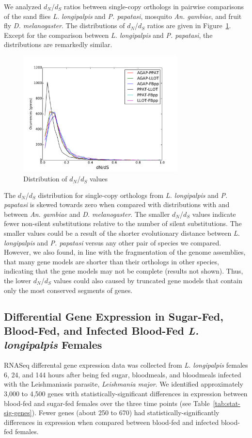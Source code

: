We analyzed $d_N$/$d_S$ ratios between single-copy orthologs in pairwise comparisons of the sand flies \emph{L. longipalpis} and \emph{P. papatasi}, mosquito \emph{An. gambiae}, and fruit fly \emph{D. melanogaster}.  The distributions of $d_N$/$d_S$ ratios are given in Figure~\ref{fig:dnds-distr}.  Except for the comparison between \emph{L. longipalpis} and \emph{P. papatasi}, the distributions are remarkedly similar.

\begin{figure}[H]
  \centering
  \includegraphics[width=0.75\textwidth]{figures/ka_ks/dN_dS}
  \caption{Distribution of $d_N$/$d_S$ values}
  \label{fig:dnds-distr}
\end{figure}


The $d_N$/$d_S$ distribution for single-copy orthologs from \emph{L. longipalpis} and \emph{P. papatasi} is skewed towards zero when compared with distributions with and between \emph{An. gambiae} and \emph{D. melanogaster}.  The smaller $d_N$/$d_S$ values indicate fewer non-silent substitutions relative to the number of silent substitutions.  The smaller values could be a result of the shorter evolutionary distance between \emph{L. longipalpis} and \emph{P. papatasi} versus any other pair of species we compared.  However, we also found, in line with the fragmentation of the genome assemblies, that many gene models are shorter than their orthologs in other species, indicating that the gene models may not be complete (results not shown).  Thus, the lower $d_N$/$d_S$ values could also caused by truncated gene models that contain only the most conserved segments of genes.

\subsection{Differential Gene Expression in Sugar-Fed, Blood-Fed, and Infected Blood-Fed \emph{L. longipalpis} Females}
RNASeq differental gene expression data was collected from \emph{L. longipalpis} females 6, 24, and 144 hours after being fed sugar, bloodmeals, and bloodmeals infected with the Leishmaniasis parasite, \emph{Leishmania major}.  We identified approximately 3,000 to 4,500 genes with statistically-significant differences in expression between blood-fed and sugar-fed females over the three time points (see Table~\ref{tab:stat-sig-genes}).  Fewer genes (about 250 to 670) had statistically-significantly differences in expression when compared between blood-fed and infected blood-fed females.

